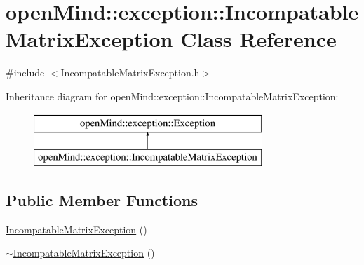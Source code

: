 \hypertarget{classopen_mind_1_1exception_1_1_incompatable_matrix_exception}{\section{open\+Mind\+:\+:exception\+:\+:Incompatable\+Matrix\+Exception Class Reference}
\label{classopen_mind_1_1exception_1_1_incompatable_matrix_exception}
}


{\ttfamily \#include $<$Incompatable\+Matrix\+Exception.\+h$>$}

Inheritance diagram for open\+Mind\+:\+:exception\+:\+:Incompatable\+Matrix\+Exception\+:\begin{figure}[H]
\begin{center}
\leavevmode
\includegraphics[height=2.000000cm]{classopen_mind_1_1exception_1_1_incompatable_matrix_exception}
\end{center}
\end{figure}
\subsection*{Public Member Functions}
\begin{DoxyCompactItemize}
\item 
\hyperlink{classopen_mind_1_1exception_1_1_incompatable_matrix_exception_a1b991a10de505f1f798b6ed9ebecfc74}{Incompatable\+Matrix\+Exception} ()
\item 
\hyperlink{classopen_mind_1_1exception_1_1_incompatable_matrix_exception_a8035ee713449fad55845e9acee0655d0}{$\sim$\+Incompatable\+Matrix\+Exception} ()
\end{DoxyCompactItemize}


